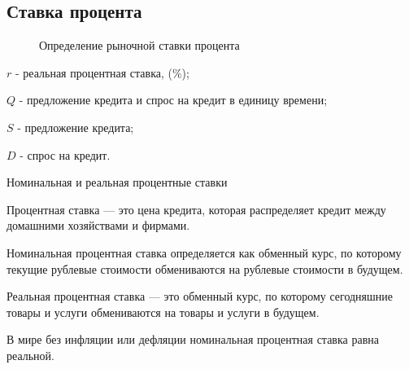 \documentclass[_DKB_p1_Money.tex]{subfiles}
\begin{document}

\subsection{Ставка процента}
\begin{frame}[shrink=15]
\begin{figure}
\center
	\begin{overprint}
\end{overprint}
\vspace*{-1.5em}
\caption{Определение рыночной ставки процента}
\end{figure}
$r$ - реальная процентная ставка, (\%); 

$Q$ - предложение кредита и спрос на кредит в единицу времени;

$S$ - предложение кредита;

$D$ - спрос на кредит.
\end{frame}

\begin{frame}[allowframebreaks]{Номинальная и реальная процентные ставки}
\begin{block}{Процентная ставка }
\quad
— это цена кредита, которая распределяет кредит между домашними хозяйствами и фирмами.
\end{block}

\pagebreak
\begin{block}{Номинальная процентная ставка }
\quad
определяется как обменный курс, по которому текущие рублевые стоимости обмениваются на рублевые стоимости в будущем. 
\end{block}

\pagebreak
\begin{block}{Реальная процентная ставка }
\quad
— это обменный курс, по которому сегодняшние товары и услуги  обмениваются на товары и услуги в будущем. 
\end{block}

В мире без инфляции или дефляции номинальная процентная ставка равна реальной. 

\end{frame}
\end{document}
